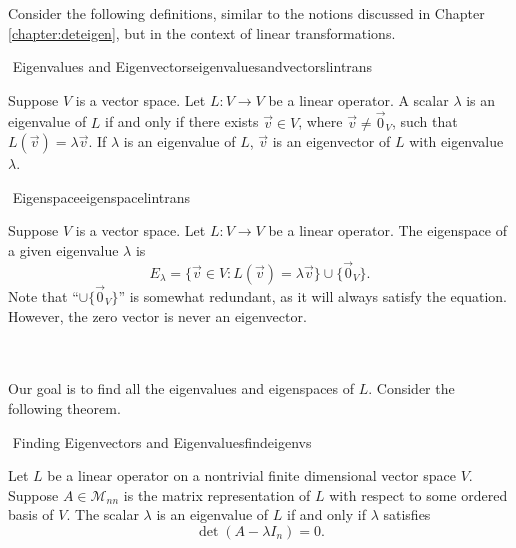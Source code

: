         Consider the following definitions, similar to the notions discussed in Chapter \ref{chapter:deteigen}, but in the context of linear transformations.
        \begin{definition}{\Stop\,\,Eigenvalues and Eigenvectors}{eigenvaluesandvectorslintrans}

            Suppose \(V\) is a vector space. Let \(L:V\to V\) be a linear operator. A scalar \(\lambda\) is an eigenvalue of \(L\) if and only if there exists \(\vec{v}\in V\), where \(\vec{v}\neq\vec{0}_V\), such that \(L(\vec{v})=\lambda \vec{v}\). If \(\lambda\) is an eigenvalue of \(L\), \(\vec{v}\) is an eigenvector of \(L\) with eigenvalue \(\lambda\). 

        \end{definition}
        \begin{definition}{\Stop\,\,Eigenspace}{eigenspacelintrans}

            Suppose \(V\) is a vector space. Let \(L:V\to V\) be a linear operator. The eigenspace of a given eigenvalue \(\lambda\) is
            \begin{equation*}
                E_\lambda=\{\vec{v}\in V:L(\vec{v})=\lambda \vec{v}\}\cup\{\vec{0}_V\}.
            \end{equation*}
            Note that ``\(\cup\{\vec{0}_V\}\)'' is somewhat redundant, as it will always satisfy the equation. However, the zero vector is never an eigenvector.
        
        \end{definition}
        \vphantom
        \\
        \\
        Our goal is to find all the eigenvalues and eigenspaces of \(L\). Consider the following theorem.
        \begin{theorem}{\Stop\,\,Finding Eigenvectors and Eigenvalues}{findeigenvs}
    
            Let \(L\) be a linear operator on a nontrivial finite dimensional vector space \(V\). Suppose \(A\in\mathcal{M}_{nn}\) is the matrix representation of \(L\) with respect to some ordered basis of \(V\). The scalar \(\lambda\) is an eigenvalue of \(L\) if and only if \(\lambda\) satisfies
            \begin{equation*}
                \det(A-\lambda I_n)=0.
            \end{equation*}
            
        \end{theorem}
        \vphantom
        \\
